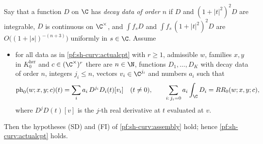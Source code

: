 \begin{proposition}\label{pf:sh-curv:levtrans}
Say that a function $D$ on $\C$ has \emph{decay data of order $n$} if $D$ and $(1+|t|^2)^2D$ are integrable, $D$ is continuous
on $\C^\times$, and $\int f_sD$ and $\int f_s\,(1+|t|^2)^2D$ are $O\bigl((1+|s|)^{-(n+3)}\bigr)$ uniformly in $s\in\C$. Assume
\begin{itemize}
\item[(E0)] for all data as in \cref{pf:sh-curv:actualcpt} with $r\ge1$, admissible $w$, families $x,y$ in
$K^{\mathrm{her}}_0$ and $c\in(\C^\times)^r$ there are $n\in\N$, functions $D_1,\dots,D_K$ with decay data of order $n$,
integers $j_i\le n$, vectors $v_i\in\C^{j_i}$ and numbers $a_i$ such that
\[
\mathrm{ph}_0(w;x,y;c)(t)=\sum_ia_i\,D^{j_i}D_i(t)[v_i]\quad(t\ne0),\qquad\sum_{i:\,j_i=0}a_i\int_\C D_i=RR_0(w;x,y;c),
\]
where $D^jD(t)[v]$ is the $j$-th real derivative at $t$ evaluated at $v$.
\end{itemize}
Then the hypotheses (SD) and (FI) of \cref{pf:sh-curv:assembly} hold; hence \cref{pf:sh-curv:actualcpt} holds.
\end{proposition}

